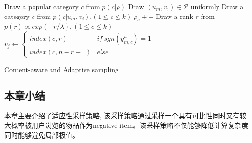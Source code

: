 \IncMargin{1em}
\begin{algorithm}
	\SetAlgoNoLine %
	
	
	\BlankLine
	 Draw a popular category $c$ from $p\left(c|\rho\right)$\;
	 Draw $\left(u_m,v_i\right) \in \mathcal{P}$ uniformly\;
	 Draw a category $c$ from $p\left(c|u_m,v_i\right)$,$\left(1\leq c \leq k\right)$\;
	 $\rho_c ++$\;
	 Draw a rank $r$ from $p\left(r\right) \propto exp\left(-r/\lambda\right),\left(1\leq c \leq k\right)$\;
	 　
	 $v_j \leftarrow 
	 \begin{cases}
	 index\left(c,r\right) & if \ sgn\left(y_{m,c}^u\right) = 1\\
	 index\left(c,n-r-1\right) & else
	 \end{cases}$\;
	 
	\caption{Content-aware and Adaptive sampling}
	\label{al2}
\end{algorithm}
\DecMargin{1em}




\subsection{本章小结}
本章主要介绍了适应性采样策略, 该采样策略通过采样一个具有可比性同时又有较大概率被用户浏览的物品作为negative item。该采样策略不仅能够降低计算复杂度同时能够避免局部极值。